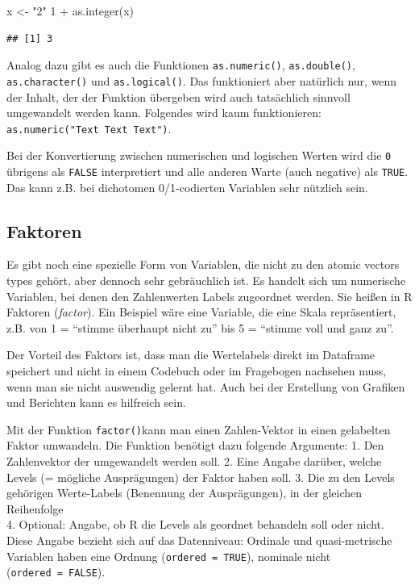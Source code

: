 \documentclass[
]{book}
\newenvironment{Shaded}{\begin{snugshade}}{\end{snugshade}}
\newcommand{\DecValTok}[1]{\textcolor[rgb]{0.00,0.00,0.81}{#1}}
\newcommand{\FunctionTok}[1]{\textcolor[rgb]{0.00,0.00,0.00}{#1}}
\newcommand{\NormalTok}[1]{#1}
\newcommand{\OtherTok}[1]{\textcolor[rgb]{0.56,0.35,0.01}{#1}}
\newcommand{\SpecialCharTok}[1]{\textcolor[rgb]{0.00,0.00,0.00}{#1}}
\newcommand{\StringTok}[1]{\textcolor[rgb]{0.31,0.60,0.02}{#1}}
\begin{document}
\begin{Shaded}
\begin{Highlighting}[]
\NormalTok{x }\OtherTok{\textless{}{-}} \StringTok{"2"}
\DecValTok{1} \SpecialCharTok{+} \FunctionTok{as.integer}\NormalTok{(x)}
\end{Highlighting}
\end{Shaded}

\begin{verbatim}
## [1] 3
\end{verbatim}

Analog dazu gibt es auch die Funktionen \texttt{as.numeric()}, \texttt{as.double()}, \texttt{as.character()} und \texttt{as.logical()}. Das funktioniert aber natürlich nur, wenn der Inhalt, der der Funktion übergeben wird auch tatsächlich sinnvoll umgewandelt werden kann. Folgendes wird kaum funktionieren: \texttt{as.numeric("Text\ Text\ Text")}.

Bei der Konvertierung zwischen numerischen und logischen Werten wird die \texttt{0} übrigens als \texttt{FALSE} interpretiert und alle anderen Warte (auch negative) als \texttt{TRUE}. Das kann z.B. bei dichotomen 0/1-codierten Variablen sehr nützlich sein.

\hypertarget{faktoren}{%
\subsection{Faktoren}\label{faktoren}}

Es gibt noch eine spezielle Form von Variablen, die nicht zu den atomic vectors types gehört, aber dennoch sehr gebräuchlich ist. Es handelt sich um numerische Variablen, bei denen den Zahlenwerten Labels zugeordnet werden. Sie heißen in R Faktoren (\emph{factor}). Ein Beispiel wäre eine Variable, die eine Skala repräsentiert, z.B. von 1 = ``stimme überhaupt nicht zu'' bis 5 = ``stimme voll und ganz zu''.

Der Vorteil des Faktors ist, dass man die Wertelabels direkt im Dataframe speichert und nicht in einem Codebuch oder im Fragebogen nachsehen muss, wenn man sie nicht auswendig gelernt hat. Auch bei der Erstellung von Grafiken und Berichten kann es hilfreich sein.

Mit der Funktion \texttt{factor()}kann man einen Zahlen-Vektor in einen gelabelten Faktor umwandeln. Die Funktion benötigt dazu folgende Argumente:
1. Den Zahlenvektor der umgewandelt werden soll.
2. Eine Angabe darüber, welche Levels (= mögliche Ausprägungen) der Faktor haben soll.
3. Die zu den Levels gehörigen Werte-Labels (Benennung der Ausprägungen), in der gleichen Reihenfolge\\
4. Optional: Angabe, ob R die Levels als geordnet behandeln soll oder nicht. Diese Angabe bezieht sich auf das Datenniveau: Ordinale und quasi-metrische Variablen haben eine Ordnung (\texttt{ordered\ =\ TRUE}), nominale nicht (\texttt{ordered\ =\ FALSE}).
\end{document}
